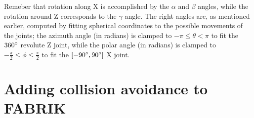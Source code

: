 Remeber that rotation along X is accomplished by the $\alpha$ and $\beta$ angles, while the rotation around Z corresponds to the $\gamma$ angle. The right angles are, as mentioned earlier, computed by fitting spherical coordinates to the possible movements of the joints; the azimuth angle (in radians) is clamped to $-\pi \le \theta < \pi$ to fit the $360\degree$ revolute Z joint, while the polar angle (in radians) is clamped to $-\frac{\pi}{2} \le \phi \le \frac{\pi}{2}$ to fit the $\left[-90\degree, 90\degree\right]$ X joint.

\section{Adding collision avoidance to FABRIK}
